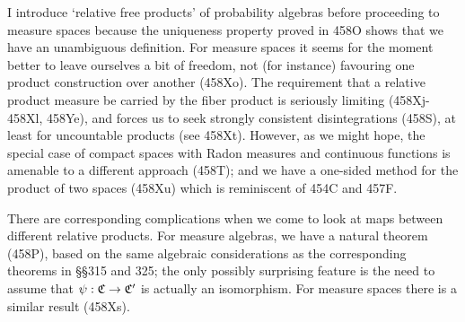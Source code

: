 {I introduce `relative free products' of probability algebras before
proceeding
to measure spaces because the uniqueness property proved in 458O shows
that we have an unambiguous definition.   For measure spaces it seems
for the moment better to leave ourselves a bit of freedom, not (for
instance) favouring one product construction over another (458Xo).
The requirement that a relative product measure be carried by the fiber
product is seriously limiting
(458Xj-458Xl, %
458Ye), and forces us to seek strongly consistent disintegrations
(458S), at least for uncountable products (see 458Xt).   However, as we
might hope, the special case of compact spaces with Radon measures and
continuous functions is amenable to a different approach (458T);  and we
have a one-sided method for the product of two spaces (458Xu) which is
reminiscent of 454C and 457F.

There are corresponding complications when we
come to look at maps between different relative products.   For
measure algebras, we have a natural theorem (458P), based on the
same algebraic considerations as the corresponding theorems in \S\S315
and 325;  the only possibly surprising feature is the need to assume
that $\psi:\frak C\to\frak C'$ is actually an isomorphism.   For measure
spaces there is a similar result (458Xs).

}%

\discrpage


